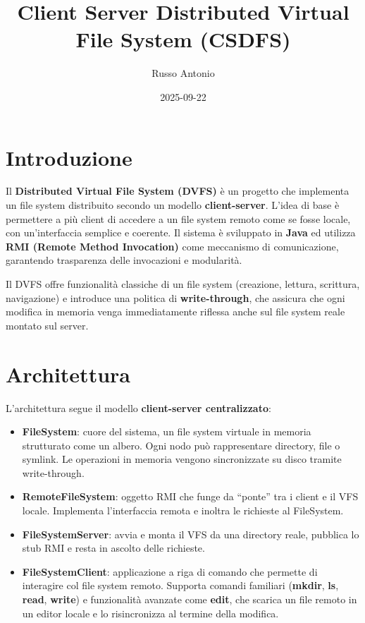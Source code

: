 \documentclass[
]{article}
\title{Client Server Distributed Virtual File System (CSDFS)}
\author{Russo Antonio}
\date{2025-09-22}
\providecommand{\tightlist}{%
  \setlength{\itemsep}{0pt}\setlength{\parskip}{0pt}}
\begin{document}
\maketitle

\section{Introduzione}\label{introduzione}

Il \textbf{Distributed Virtual File System (DVFS)} è un progetto che
implementa un file system distribuito secondo un modello
\textbf{client-server}. L'idea di base è permettere a più client di
accedere a un file system remoto come se fosse locale, con
un'interfaccia semplice e coerente. Il sistema è sviluppato in
\textbf{Java} ed utilizza \textbf{RMI (Remote Method Invocation)} come
meccanismo di comunicazione, garantendo trasparenza delle invocazioni e
modularità.

Il DVFS offre funzionalità classiche di un file system (creazione,
lettura, scrittura, navigazione) e introduce una politica di
\textbf{write-through}, che assicura che ogni modifica in memoria venga
immediatamente riflessa anche sul file system reale montato sul server.

\section{Architettura}\label{architettura}

L'architettura segue il modello \textbf{client-server centralizzato}:

\begin{itemize}
\tightlist
\item
  \textbf{FileSystem}: cuore del sistema, un file system virtuale in
  memoria strutturato come un albero. Ogni nodo può rappresentare
  directory, file o symlink. Le operazioni in memoria vengono
  sincronizzate su disco tramite write-through.
\item
  \textbf{RemoteFileSystem}: oggetto RMI che funge da ``ponte'' tra i
  client e il VFS locale. Implementa l'interfaccia remota e inoltra le
  richieste al FileSystem.
\item
  \textbf{FileSystemServer}: avvia e monta il VFS da una directory
  reale, pubblica lo stub RMI e resta in ascolto delle richieste.
\item
  \textbf{FileSystemClient}: applicazione a riga di comando che permette
  di interagire col file system remoto. Supporta comandi familiari
  (\textbf{mkdir}, \textbf{ls}, \textbf{read}, \textbf{write}) e
  funzionalità avanzate come \textbf{edit}, che scarica un file remoto
  in un editor locale e lo risincronizza al termine della modifica.
\end{itemize}
\end{document}
